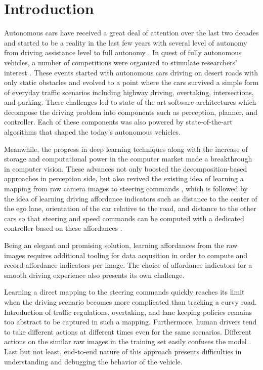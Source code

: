 \chapter{Introduction}
\label{chp:b1}

Autonomous cars have received a great deal of attention over the last two
decades and started to be a reality in the last few years with several level of
autonomy from driving assistance level to full autonomy
\cite{Holstein2018EthicalAS}. In quest of fully autonomous vehicles, a number
of competitions were organized to stimulate researchers' interest
\cite{Buehler2007The2D, Buehler2009TheDU}. These events started with autonomous
cars driving on desert roads with only static obstacles and evolved to a point
where the cars survived a simple form of everyday traffic scenarios including
highway driving, overtaking, intersections, and parking. These challenges led
to state-of-the-art software architectures which decompose the driving problem
into components such as perception, planner, and controller. Each of these
components was also powered by state-of-the-art algorithms that shaped the
today's autonomous vehicles.

Meanwhile, the progress in deep learning techniques along with the increase of
storage and computational power in the computer market made a breakthrough in
computer vision. These advances not only boosted the decomposition-based
approaches in perception side, but also revived the existing idea of learning a
mapping from raw camera images to steering commands \cite{Bojarski2016EndTE},
which is followed by the idea of learning driving affordance indicators such as
distance to the center of the ego lane, orientation of the car relative to the
road, and distance to the other cars so that steering and speed commands can be
computed with a dedicated controller based on these affordances
\cite{Chen2015DeepDrivingLA}.

Being an elegant and promising solution, learning affordances from the raw
images requires additional tooling for data acqusition in order to compute and
record affordance indicators per image. The choice of affordance indicators for
a smooth driving experience also presents its own challenge.

Learning a direct mapping to the steering commands quickly reaches its limit
when the driving scenario becomes more complicated than tracking a curvy
road. Introduction of traffic regulations, overtaking, and lane keeping
policies remains too abstract to be captured in such a mapping. Furthermore,
human drivers tend to take different actions at different times even for the
same scenarios. Different actions on the similar raw images in the training set
easily confuses the model \cite{Chen2015DeepDrivingLA}. Last but not least,
end-to-end nature of this approach presents difficulties in understanding and
debugging the behavior of the vehicle.

